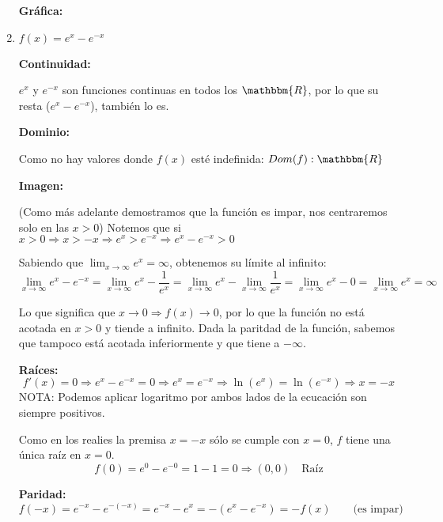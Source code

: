 \documentclass[12pt]{article}
\begin{document}
\begin{enumerate}[\hspace{9px} a)]
        \textbf{Gr\'afica: }

    \item \(f(x)=e^x-e^{-x}\)\medskip
    
        \textbf{Continuidad: }\medskip

            \(e^x\) y \(e^{-x}\) son funciones continuas en todos los \(\mathbbm{R}\), por lo que su resta (\(e^x-e^{-x}\)), tambi\'en lo es.\medskip

        \textbf{Dominio: }\medskip

            Como no hay valores donde $f(x)$ est\'e indefinida: \(Dom(f):\mathbbm{R}\)\medskip

        \textbf{Imagen: }\medskip

            (Como m\'as adelante demostramos que la funci\'on es impar, nos centraremos solo en las \(x>0\)) Notemos que si \(x>0 \Rightarrow x>-x \Rightarrow e^x>e^{-x} \Rightarrow e^x-e^{-x}>0\)\medskip

            Sabiendo que \(\lim_{x\to\infty}e^x=\infty\), obtenemos su l\'imite al infinito:
            \begin{equation*}
                \lim_{x\to\infty}e^x-e^{-x}=\lim_{x\to\infty}e^x-\frac{1}{e^x}=\lim_{x\to\infty}e^x-\lim_{x\to\infty}\frac{1}{e^x} = \lim_{x\to\infty}e^x-0=\lim_{x\to\infty}e^x=\infty
            \end{equation*}

            Lo que significa que \(x\to0 \Rightarrow f(x)\to0\), por lo que la funci\'on no est\'a acotada en \(x>0\) y tiende a infinito. Dada la paritdad de la funci\'on, sabemos que tampoco est\'a acotada inferiormente y que tiene a \(-\infty\).\medskip

        \textbf{Ra\'ices: }
            \begin{equation*}
                f'(x)=0 \Rightarrow e^x-e^{-x}=0 \Rightarrow e^x=e^{-x} \Rightarrow \ln(e^x)=\ln(e^{-x}) \Rightarrow x=-x
            \end{equation*}
            NOTA: Podemos aplicar logaritmo por ambos lados de la ecucaci\'on son siempre positivos.\medskip

            Como en los realies la premisa \(x = -x\) s\'olo se cumple con \(x=0\), \(f\) tiene una \'unica ra\'iz en \(x=0\).
            \begin{equation*}
                f(0)=e^0-e^{-0}=1-1=0 \Longrightarrow (0,0) \quad \text{Raíz}
            \end{equation*}

        \textbf{Paridad: }
            \begin{equation*}
                f(-x) = e^{-x}-e^{-(-x)} = e^{-x}-e^{x} = -(e^x-e^{-x}) = -f(x) \qquad \text{(es impar)}
            \end{equation*}


\end{enumerate}
\end{document}
